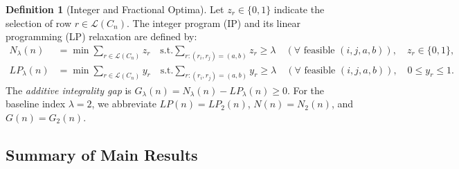 \documentclass[11pt,a4paper]{article}
\theoremstyle{definition}
\newtheorem{definition}[theorem]{Definition}
\theoremstyle{remark}
\begin{document}
\begin{definition}[Integer and Fractional Optima]
Let $z_r \in \{0, 1\}$ indicate the selection of row $r \in \mathcal{L}(C_n)$. The integer program (IP) and its linear programming (LP) relaxation are defined by:
\begin{equation}
\begin{aligned}
    N_\lambda(n) &= \min \sum_{r \in \mathcal{L}(C_n)} z_r \quad \text{s.t.} \sum_{r: (r_i, r_j)=(a, b)} z_r \ge \lambda \quad (\forall \text{ feasible } (i, j, a, b)), \quad z_r \in \{0, 1\}, \\
    LP_\lambda(n) &= \min \sum_{r \in \mathcal{L}(C_n)} y_r \quad \text{s.t.} \sum_{r: (r_i, r_j)=(a, b)} y_r \ge \lambda \quad (\forall \text{ feasible } (i, j, a, b)), \quad 0 \le y_r \le 1.
\end{aligned}
\end{equation}
The \emph{additive integrality gap} is $G_\lambda(n) = N_\lambda(n) - LP_\lambda(n) \ge 0$. For the baseline index $\lambda = 2$, we abbreviate $LP(n) = LP_2(n)$, $N(n) = N_2(n)$, and $G(n) = G_2(n)$.
\end{definition}

\subsection{Summary of Main Results}
\end{document}
